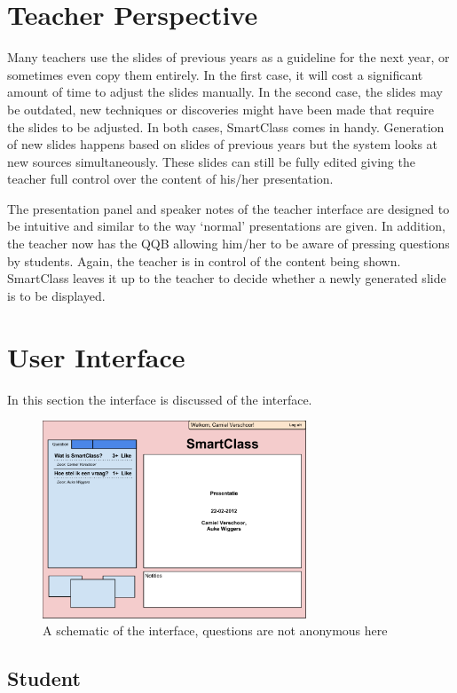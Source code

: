 \documentclass[11pt]{article}
\begin{document}
\section{Teacher Perspective}
Many teachers use the slides of previous years as a guideline for the next year, or sometimes even copy them entirely. In the first case, it will cost a significant amount of time to adjust the slides manually. In the second case, the slides may be outdated, new techniques or discoveries might have been made that require the slides to be adjusted. In both cases, SmartClass comes in handy.  Generation of new slides happens based on slides of previous years but the system looks at new sources simultaneously. These slides can still be fully edited giving the teacher full control over the content of his/her presentation.

The presentation panel and speaker notes of the teacher interface are designed to be intuitive and similar to the way `normal’ presentations are given. In addition, the teacher now has the QQB allowing him/her to be aware of pressing questions by students. Again, the teacher is in control of the content being shown. SmartClass leaves it up to the teacher to decide whether a newly generated slide is to be displayed. 

\section{User Interface}
In this section the interface is discussed of the interface.
\begin{figure}[!h]
\centering
\includegraphics[width=0.7\textwidth]{KBMSInterface.png}
\caption{A schematic of the interface, questions are not anonymous here}
\end{figure}
\subsection{Student}
\end{document}
